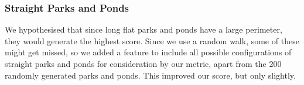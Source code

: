 \subsubsection{Straight Parks and Ponds} 
We hypothesised that since long flat parks and ponds have a large perimeter, they would generate the highest score. Since we use a random walk, some of these might get missed, so we added a feature to include all possible configurations of straight parks and ponds for consideration by our metric, apart from the 200 randomly generated parks and ponds. This improved our score, but only slightly.




